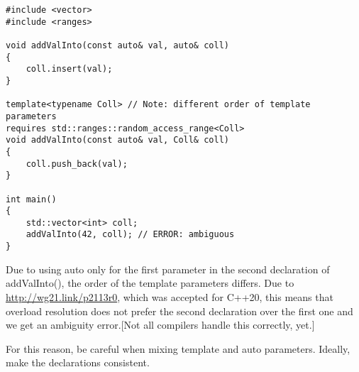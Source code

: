 \begin{lstlisting}[style=styleCXX]
#include <vector>
#include <ranges>

void addValInto(const auto& val, auto& coll)
{
	coll.insert(val);
}

template<typename Coll> // Note: different order of template parameters
requires std::ranges::random_access_range<Coll>
void addValInto(const auto& val, Coll& coll)
{
	coll.push_back(val);
}

int main()
{
	std::vector<int> coll;
	addValInto(42, coll); // ERROR: ambiguous
}
\end{lstlisting}

Due to using auto only for the first parameter in the second declaration of addValInto(), the order of the template parameters differs. Due to \url{http://wg21.link/p2113r0}, which was accepted for C++20, this means that overload resolution does not prefer the second declaration over the first one and we get an ambiguity error.[Not all compilers handle this correctly, yet.]

For this reason, be careful when mixing template and auto parameters. Ideally, make the declarations consistent.











